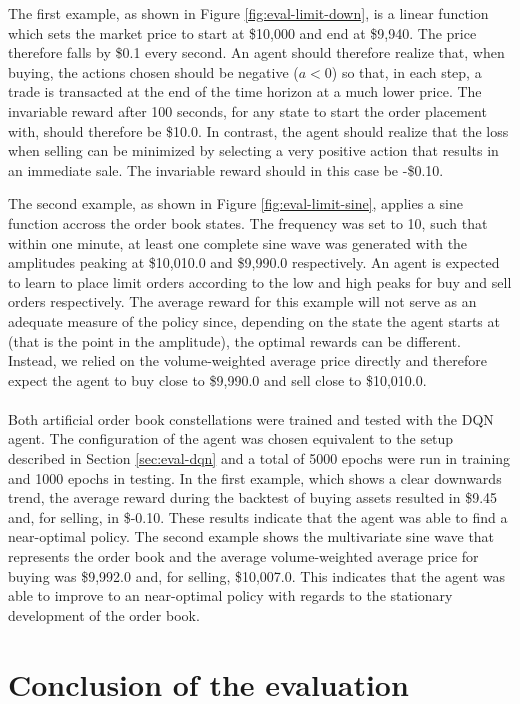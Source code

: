 The first example, as shown in Figure \ref{fig:eval-limit-down}, is a linear function which sets the market price to start at \$10,000 and end at \$9,940.
The price therefore falls by \$0.1 every second.
An agent should therefore realize that, when buying, the actions chosen should be negative ($a<0$) so that, in each step, a trade is transacted at the end of the time horizon at a much lower price.
The invariable reward after 100 seconds, for any state to start the order placement with, should therefore be \$10.0.
In contrast, the agent should realize that the loss when selling can be minimized by selecting a very positive action that results in an immediate sale.
The invariable reward should in this case be -\$0.10.

The second example, as shown in Figure \ref{fig:eval-limit-sine}, applies a sine function accross the order book states.
The frequency was set to 10, such that within one minute, at least one complete sine wave was generated with the amplitudes peaking at \$10,010.0 and \$9,990.0 respectively.
An agent is expected to learn to place limit orders according to the low and high peaks for buy and sell orders respectively.
The average reward for this example will not serve as an adequate measure of the policy since, depending on the state the agent starts at (that is the point in the amplitude), the optimal rewards can be different.
Instead, we relied on the volume-weighted average price directly and therefore expect the agent to buy close to \$9,990.0 and sell close to \$10,010.0.
\\
\\
Both artificial order book constellations were trained and tested with the DQN agent.
The configuration of the agent was chosen equivalent to the setup described in Section \ref{sec:eval-dqn} and a total of 5000 epochs were run in training and 1000 epochs in testing.
In the first example, which shows a clear downwards trend, the average reward during the backtest of buying assets resulted in \$9.45 and, for selling, in \$-0.10.
These results indicate that the agent was able to find a near-optimal policy.
The second example shows the multivariate sine wave that represents the order book and the average volume-weighted average price for buying was \$9,992.0 and, for selling, \$10,007.0.
This indicates that the agent was able to improve to an near-optimal policy with regards to the stationary development of the order book.

\section{Conclusion of the evaluation}

